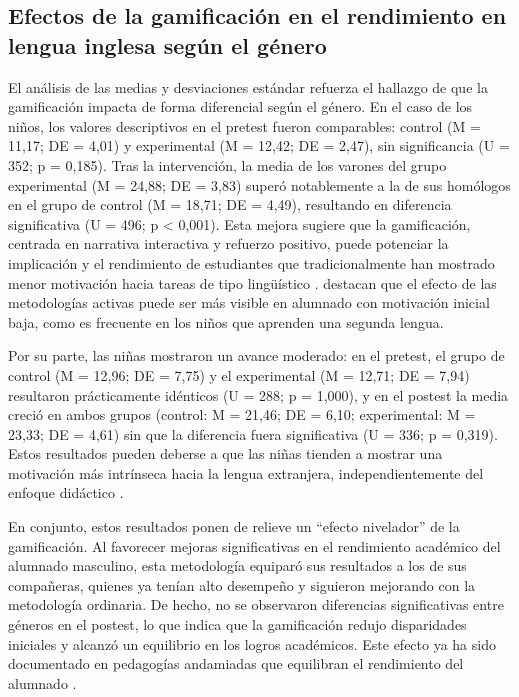 \documentclass[spanish]{textolivre}
\begin{document}
\subsection{Efectos de la gamificación en el rendimiento en lengua inglesa según el género}
El análisis de las medias y desviaciones estándar refuerza el hallazgo de que la gamificación impacta de forma diferencial según el género. En el caso de los niños, los valores descriptivos en el pretest fueron comparables: control (M = 11,17; DE = 4,01) y experimental (M = 12,42; DE = 2,47), sin significancia (U = 352; p = 0,185). Tras la intervención, la media de los varones del grupo experimental (M = 24,88; DE = 3,83) superó notablemente a la de sus homólogos en el grupo de control (M = 18,71; DE = 4,49), resultando en diferencia significativa (U = 496; p < 0,001). Esta mejora sugiere que la gamificación, centrada en narrativa interactiva y refuerzo positivo, puede potenciar la implicación y el rendimiento de estudiantes que tradicionalmente han mostrado menor motivación hacia tareas de tipo lingüístico \cite{prieto2018, dicheva2018, bartholomew2018}. \textcite{fiestas2023} destacan que el efecto de las metodologías activas puede ser más visible en alumnado con motivación inicial baja, como es frecuente en los niños que aprenden una segunda lengua.

Por su parte, las niñas mostraron un avance moderado: en el pretest, el grupo de control (M = 12,96; DE = 7,75) y el experimental (M = 12,71; DE = 7,94) resultaron prácticamente idénticos (U = 288; p = 1,000), y en el postest la media creció en ambos grupos (control: M = 21,46; DE = 6,10; experimental: M = 23,33; DE = 4,61) sin que la diferencia fuera significativa (U = 336; p = 0,319). Estos resultados pueden deberse a que las niñas tienden a mostrar una motivación más intrínseca hacia la lengua extranjera, independientemente del enfoque didáctico \cite{fernandezbarrionuevo2022, abdullahi2015}. 

En conjunto, estos resultados ponen de relieve un ``efecto nivelador'' de la gamificación. Al favorecer mejoras significativas en el rendimiento académico del alumnado masculino, esta metodología equiparó sus resultados a los de sus compañeras, quienes ya tenían alto desempeño y siguieron mejorando con la metodología ordinaria. De hecho, no se observaron diferencias significativas entre géneros en el postest, lo que indica que la gamificación redujo disparidades iniciales y alcanzó un equilibrio en los logros académicos. Este efecto ya ha sido documentado en pedagogías andamiadas que equilibran el rendimiento del alumnado \cite{nieto2019, nieto2026, nieto-casanova2026}.
\end{document}

